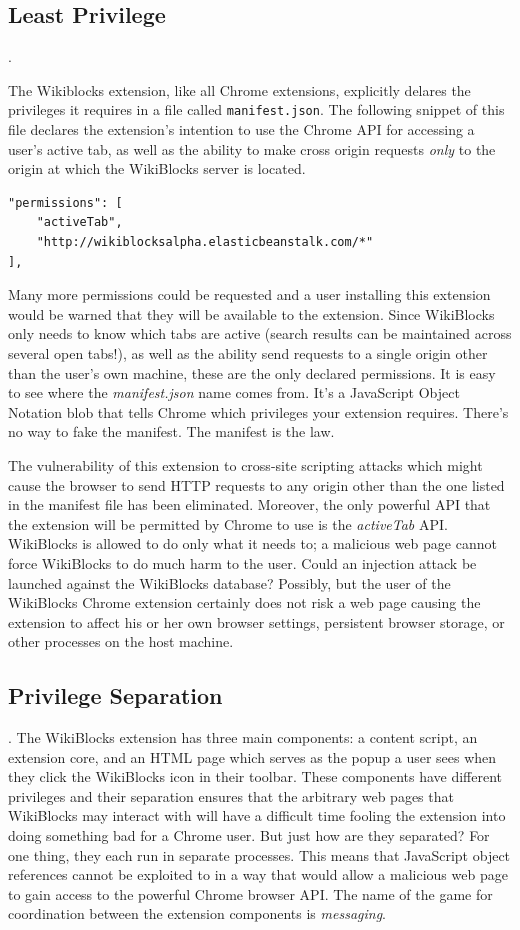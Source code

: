 \documentclass[a4paper, 11pt]{article} %
\begin{document}
\subsection{Least Privilege}.

The Wikiblocks extension, like all Chrome extensions, explicitly delares the privileges it requires in a file called \texttt{manifest.json}. \cite{wikib0:online} The following snippet of this file declares the extension's intention to use the Chrome API for accessing a user's active tab, as well as the ability to make cross origin requests \textit{only} to the origin at which the WikiBlocks server is located. 

\begin{lstlisting}
"permissions": [
	"activeTab",
	"http://wikiblocksalpha.elasticbeanstalk.com/*"
],
\end{lstlisting}

Many more permissions could be requested and a user installing this extension would be warned that they will be available to the extension. Since WikiBlocks only needs to know which tabs are active (search results can be maintained across several open tabs!), as well as the ability send requests to a single origin other than the user's own machine, these are the only declared permissions. It is easy to see where the \textit{manifest.json} name comes from. It's a JavaScript Object Notation blob that tells Chrome which privileges your extension requires. There's no way to fake the manifest. The manifest is the law.

The vulnerability of this extension to cross-site scripting attacks which might cause the browser to send HTTP requests to any origin other than the one listed in the manifest file has been eliminated. Moreover, the only powerful API that the extension will be permitted by Chrome to use is the \textit{activeTab} API. WikiBlocks is allowed to do only what it needs to; a malicious web page cannot force WikiBlocks to do much harm to the user. Could an injection attack be launched against the WikiBlocks database? Possibly, but the user of the WikiBlocks Chrome extension certainly does not risk a web page causing the extension to affect his or her own browser settings, persistent browser storage, or other processes on the host machine.

\subsection{Privilege Separation}. The WikiBlocks extension has three main components: a content script, an extension core, and an HTML page which serves as the popup a user sees when they click the WikiBlocks icon in their toolbar. These components have different privileges and their separation ensures that the arbitrary web pages that WikiBlocks may interact with will have a difficult time fooling the extension into doing something bad for a Chrome user. But just how are they separated? For one thing, they each run in separate processes. This means that JavaScript object references cannot be exploited to in a way that would allow a malicious web page to gain access to the powerful Chrome browser API. The name of the game for coordination between the extension components is \textit{messaging}.
\end{document}
